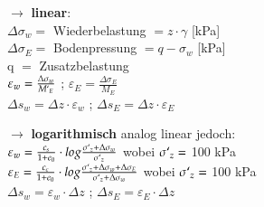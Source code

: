 \begin{minipage}{0.5\linewidth}
	$\rightarrow$ \textbf{linear}: \\
	$\Delta \sigma_w=$ Wiederbelastung $=z \cdot \gamma$ [kPa] \\
	$\Delta \sigma_E=$ Bodenpressung $=q - \sigma_w$ [kPa] \\
	q $=$ Zusatzbelastung \\
	$\varepsilon_w = \frac{\Delta \sigma_w}{M`_E}$ ; $\varepsilon_E = \frac{\Delta \sigma_E}{M_E}$ \\
	$\Delta s_w = \Delta z \cdot\varepsilon_w$ ; $\Delta s_E = \Delta z \cdot\varepsilon_E$\\
\end{minipage}	
\begin{minipage}{0.5\linewidth}
	$\rightarrow$ \textbf{logarithmisch} analog linear jedoch: \\
	$\varepsilon_w = \frac{c_s}{1 + e_0} \cdot log \frac{\sigma`_z + \Delta \sigma_w}{\sigma`_z}$ wobei $\sigma`_z =$ 100 kPa \\
	$\varepsilon_E = \frac{c_c}{1 + e_0} \cdot log \frac{\sigma`_z + \Delta \sigma_w + \Delta \sigma_E}{\sigma`_z + \Delta \sigma_w}$ wobei $\sigma`_z =$ 100 kPa \\
	$\Delta s_w= \varepsilon_w \cdot \Delta z$ ; $\Delta s_E= \varepsilon_E \cdot \Delta z$ \\
		\vspace{\baselineskip}
\end{minipage}



